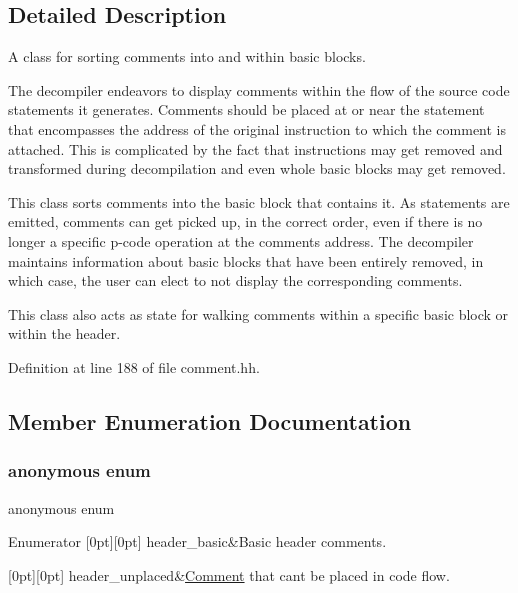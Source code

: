 \subsection{Detailed Description}
A class for sorting comments into and within basic blocks. 

The decompiler endeavors to display comments within the flow of the source code statements it generates. Comments should be placed at or near the statement that encompasses the address of the original instruction to which the comment is attached. This is complicated by the fact that instructions may get removed and transformed during decompilation and even whole basic blocks may get removed.

This class sorts comments into the basic block that contains it. As statements are emitted, comments can get picked up, in the correct order, even if there is no longer a specific p-\/code operation at the comment\textquotesingle{}s address. The decompiler maintains information about basic blocks that have been entirely removed, in which case, the user can elect to not display the corresponding comments.

This class also acts as state for walking comments within a specific basic block or within the header. 

Definition at line 188 of file comment.\+hh.



\subsection{Member Enumeration Documentation}
\mbox{\label{class_comment_sorter_a583f6f8791a910c7033cfe2f0c583d91}} 
\subsubsection{\texorpdfstring{anonymous enum}{anonymous enum}}
{\footnotesize\ttfamily anonymous enum}

\begin{DoxyEnumFields}{Enumerator}
[0pt][0pt]{}\mbox{\label{class_comment_sorter_a583f6f8791a910c7033cfe2f0c583d91a972094c6778abc30bfd1d6f02eec65db}} 
header\+\_\+basic&Basic header comments. \\
\hline

[0pt][0pt]{}\mbox{\label{class_comment_sorter_a583f6f8791a910c7033cfe2f0c583d91a7b207fc0588a61728f14c2e90ceb05d3}} 
header\+\_\+unplaced&\mbox{\hyperlink{class_comment}{Comment}} that can\textquotesingle{}t be placed in code flow. \\
\hline

\end{DoxyEnumFields}



